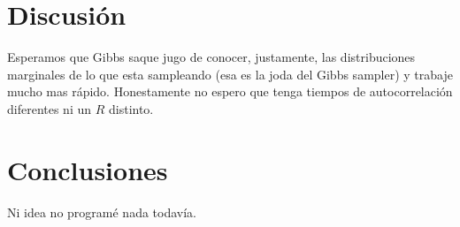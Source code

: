 \documentclass[a4paper, 12pt]{article}
\begin{document}
\section{Discusión}

Esperamos que Gibbs saque jugo de conocer, justamente, las distribuciones marginales de lo que esta sampleando (esa es la joda del Gibbs sampler) y trabaje mucho mas rápido. Honestamente no espero que tenga tiempos de autocorrelación diferentes ni un $\hat{R}$ distinto.

\section{Conclusiones}

Ni idea no programé nada todavía.

\printbibliography
\end{document}
